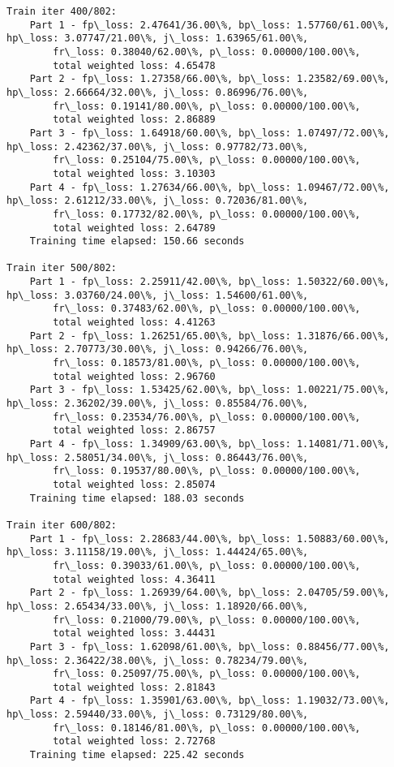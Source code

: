 \documentclass[11pt]{article}
\begin{document}
\begin{Verbatim}[commandchars=\\\{\}]
Train iter 400/802:
	Part 1 - fp\_loss: 2.47641/36.00\%, bp\_loss: 1.57760/61.00\%, hp\_loss: 3.07747/21.00\%, j\_loss: 1.63965/61.00\%, 
		fr\_loss: 0.38040/62.00\%, p\_loss: 0.00000/100.00\%, 
		total weighted loss: 4.65478
	Part 2 - fp\_loss: 1.27358/66.00\%, bp\_loss: 1.23582/69.00\%, hp\_loss: 2.66664/32.00\%, j\_loss: 0.86996/76.00\%, 
		fr\_loss: 0.19141/80.00\%, p\_loss: 0.00000/100.00\%, 
		total weighted loss: 2.86889
	Part 3 - fp\_loss: 1.64918/60.00\%, bp\_loss: 1.07497/72.00\%, hp\_loss: 2.42362/37.00\%, j\_loss: 0.97782/73.00\%, 
		fr\_loss: 0.25104/75.00\%, p\_loss: 0.00000/100.00\%, 
		total weighted loss: 3.10303
	Part 4 - fp\_loss: 1.27634/66.00\%, bp\_loss: 1.09467/72.00\%, hp\_loss: 2.61212/33.00\%, j\_loss: 0.72036/81.00\%, 
		fr\_loss: 0.17732/82.00\%, p\_loss: 0.00000/100.00\%, 
		total weighted loss: 2.64789
	Training time elapsed: 150.66 seconds

Train iter 500/802:
	Part 1 - fp\_loss: 2.25911/42.00\%, bp\_loss: 1.50322/60.00\%, hp\_loss: 3.03760/24.00\%, j\_loss: 1.54600/61.00\%, 
		fr\_loss: 0.37483/62.00\%, p\_loss: 0.00000/100.00\%, 
		total weighted loss: 4.41263
	Part 2 - fp\_loss: 1.26251/65.00\%, bp\_loss: 1.31876/66.00\%, hp\_loss: 2.70773/30.00\%, j\_loss: 0.94266/76.00\%, 
		fr\_loss: 0.18573/81.00\%, p\_loss: 0.00000/100.00\%, 
		total weighted loss: 2.96760
	Part 3 - fp\_loss: 1.53425/62.00\%, bp\_loss: 1.00221/75.00\%, hp\_loss: 2.36202/39.00\%, j\_loss: 0.85584/76.00\%, 
		fr\_loss: 0.23534/76.00\%, p\_loss: 0.00000/100.00\%, 
		total weighted loss: 2.86757
	Part 4 - fp\_loss: 1.34909/63.00\%, bp\_loss: 1.14081/71.00\%, hp\_loss: 2.58051/34.00\%, j\_loss: 0.86443/76.00\%, 
		fr\_loss: 0.19537/80.00\%, p\_loss: 0.00000/100.00\%, 
		total weighted loss: 2.85074
	Training time elapsed: 188.03 seconds

Train iter 600/802:
	Part 1 - fp\_loss: 2.28683/44.00\%, bp\_loss: 1.50883/60.00\%, hp\_loss: 3.11158/19.00\%, j\_loss: 1.44424/65.00\%, 
		fr\_loss: 0.39033/61.00\%, p\_loss: 0.00000/100.00\%, 
		total weighted loss: 4.36411
	Part 2 - fp\_loss: 1.26939/64.00\%, bp\_loss: 2.04705/59.00\%, hp\_loss: 2.65434/33.00\%, j\_loss: 1.18920/66.00\%, 
		fr\_loss: 0.21000/79.00\%, p\_loss: 0.00000/100.00\%, 
		total weighted loss: 3.44431
	Part 3 - fp\_loss: 1.62098/61.00\%, bp\_loss: 0.88456/77.00\%, hp\_loss: 2.36422/38.00\%, j\_loss: 0.78234/79.00\%, 
		fr\_loss: 0.25097/75.00\%, p\_loss: 0.00000/100.00\%, 
		total weighted loss: 2.81843
	Part 4 - fp\_loss: 1.35901/63.00\%, bp\_loss: 1.19032/73.00\%, hp\_loss: 2.59440/33.00\%, j\_loss: 0.73129/80.00\%, 
		fr\_loss: 0.18146/81.00\%, p\_loss: 0.00000/100.00\%, 
		total weighted loss: 2.72768
	Training time elapsed: 225.42 seconds


\end{Verbatim}
\end{document}
